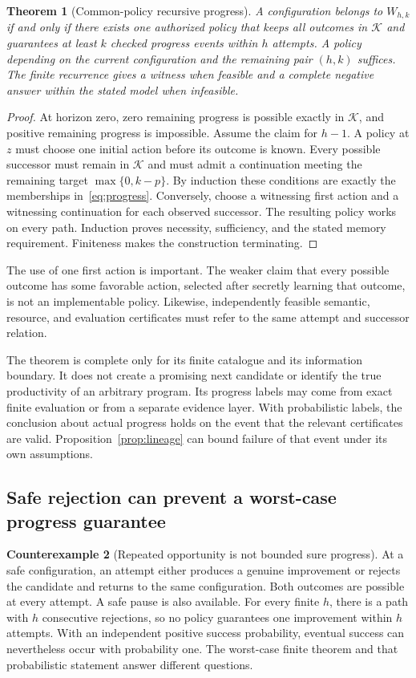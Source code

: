 \documentclass[11pt,letterpaper]{article}
\theoremstyle{plain}
\newtheorem{theorem}{Theorem}[section]
\theoremstyle{definition}
\newtheorem{counterexample}[theorem]{Counterexample}
\begin{document}
\begin{theorem}[Common-policy recursive progress]\label{thm:progress}
A configuration belongs to $W_{h,k}$ if and only if there exists one authorized policy that keeps all outcomes in $\mathcal K$ and guarantees at least $k$ checked progress events within $h$ attempts. A policy depending on the current configuration and the remaining pair $(h,k)$ suffices. The finite recurrence gives a witness when feasible and a complete negative answer within the stated model when infeasible.
\end{theorem}
\begin{proof}
At horizon zero, zero remaining progress is possible exactly in $\mathcal K$, and positive remaining progress is impossible. Assume the claim for $h-1$. A policy at $z$ must choose one initial action before its outcome is known. Every possible successor must remain in $\mathcal K$ and must admit a continuation meeting the remaining target $\max\{0,k-p\}$. By induction these conditions are exactly the memberships in~\eqref{eq:progress}. Conversely, choose a witnessing first action and a witnessing continuation for each observed successor. The resulting policy works on every path. Induction proves necessity, sufficiency, and the stated memory requirement. Finiteness makes the construction terminating.
\end{proof}

The use of one first action is important. The weaker claim that every possible outcome has some favorable action, selected after secretly learning that outcome, is not an implementable policy. Likewise, independently feasible semantic, resource, and evaluation certificates must refer to the same attempt and successor relation.

The theorem is complete only for its finite catalogue and its information boundary. It does not create a promising next candidate or identify the true productivity of an arbitrary program. Its progress labels may come from exact finite evaluation or from a separate evidence layer. With probabilistic labels, the conclusion about actual progress holds on the event that the relevant certificates are valid. Proposition~\ref{prop:lineage} can bound failure of that event under its own assumptions.

\subsection{Safe rejection can prevent a worst-case progress guarantee}
\begin{counterexample}[Repeated opportunity is not bounded sure progress]\label{ex:retry}
At a safe configuration, an attempt either produces a genuine improvement or rejects the candidate and returns to the same configuration. Both outcomes are possible at every attempt. A safe pause is also available. For every finite $h$, there is a path with $h$ consecutive rejections, so no policy guarantees one improvement within $h$ attempts. With an independent positive success probability, eventual success can nevertheless occur with probability one. The worst-case finite theorem and that probabilistic statement answer different questions.
\end{counterexample}
\end{document}
